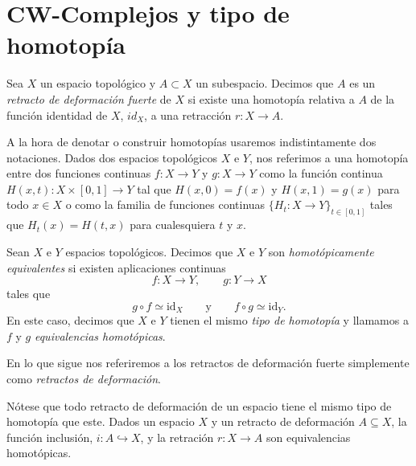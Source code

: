 \section{CW-Complejos y tipo de homotopía}
\begin{definition}
Sea $X$ un espacio topológico y $A \subset X$ un subespacio. Decimos que $A$ es un
\textit{retracto de deformación fuerte} de $X$ si existe una homotopía relativa a $A$ de la función identidad de $X$, $id_X$, a una retracción $r: X \to A$.
\end{definition}

\begin{nota}
    A la hora de denotar o construir homotopías usaremos indistintamente dos notaciones. Dados dos espacios topológicos $X$ e $Y$, nos referimos a una homotopía entre dos funciones continuas $f:X\to Y$ y $g:X\to Y$ como la función continua $H(x,t): X\times [0,1]\to Y$ tal que $H(x,0)=f(x)$ y $H(x,1)=g(x)$ para todo $x\in X$ o como la familia de funciones continuas $\{H_t: X\to Y\}_{t\in [0,1]}$ tales que $H_t(x)=H(t,x)$ para cualesquiera $t$ y $x$.
\end{nota}

\bigskip

\begin{definition}
Sean $X$ e $Y$ espacios topológicos. Decimos que $X$ e $Y$ son
\textit{homotópicamente equivalentes} si existen aplicaciones continuas
\begin{equation*}
    f: X \to Y, \qquad g: Y \to X
\end{equation*}
tales que
\begin{equation*}
    g \circ f \simeq \mathrm{id}_X \qquad \text{y} \qquad f \circ g \simeq \mathrm{id}_Y.
\end{equation*}
En este caso, decimos que $X$ e $Y$ tienen el mismo \textit{tipo de homotopía} y llamamos a $f$ y $g$ \textit{equivalencias homotópicas}.
\end{definition}

\medskip

\begin{nota}
    En lo que sigue nos referiremos a los retractos de deformación fuerte simplemente como \textit{retractos de deformación}.
\end{nota}

\begin{remark}
    Nótese que todo retracto de deformación de un espacio tiene el mismo tipo de homotopía que este. Dados un espacio $X$ y un retracto de deformación $A\subseteq X$, la función inclusión, $i: A\hookrightarrow X$, y la retración $r: X \to A$ son equivalencias homotópicas.
\end{remark}

